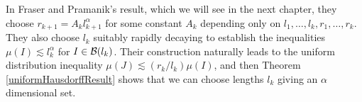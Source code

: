 
\begin{example}
	In Fraser and Pramanik's result, which we will see in the next chapter, they choose $r_{k+1} = A_k l_{k+1}^\alpha$ for some constant $A_k$ depending only on $l_1, \dots, l_k, r_1, \dots, r_k$. They also choose $l_k$ suitably rapidly decaying to establish the inequalities $\mu(I) \lesssim l_k^\alpha$ for $I \in \operatorname{\mathcal{B}}(l_k)$. Their construction naturally leads to the uniform distribution inequality $\mu(J) \lesssim (r_k/l_k) \mu(I)$, and then Theorem \ref{uniformHausdorffResult} shows that we can choose lengths $l_k$ giving an $\alpha$ dimensional set.
\end{example}


